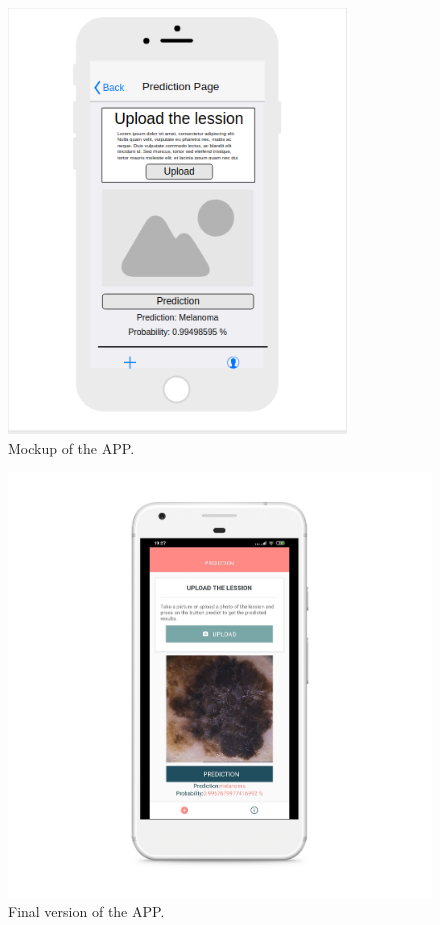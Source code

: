 \begin{figure}[H]
\centering
\includegraphics[width=0.8\textwidth]{./figures/Mockup}
\caption{Mockup of the APP.}
\label{fig:mockup}
\end{figure}


\begin{figure}[H]
\centering
\includegraphics[width=1\textwidth]{./figures/mockup-android}
\caption{Final version of the APP.}
\label{fig:app}
\end{figure}



